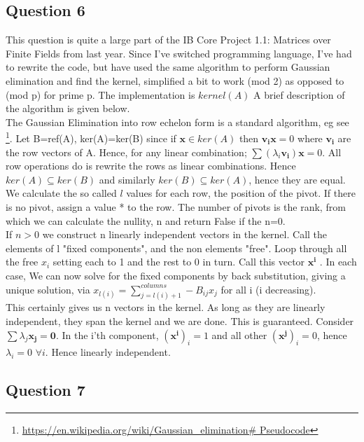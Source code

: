 \documentclass[10pt,a4paper]{report}
\begin{document}
\subsection*{Question 6}

This question is quite a large part of the IB Core Project 1.1: Matrices over Finite Fields from last year. Since I've switched programming language, I've had to rewrite the code, but have used the same algorithm to perform Gaussian elimination and find the kernel, simplified a bit to work (mod 2) as opposed to (mod p) for prime p. The implementation is $kernel(A)$ A brief description of the algorithm is given below.\\

The Gaussian Elimination into row echelon form is a standard algorithm, eg see \footnote{\url{https://en.wikipedia.org/wiki/Gaussian_elimination\# Pseudocode}}. Let B=ref(A), ker(A)=ker(B) since if $\bm{x} \in ker(A)$ then $\bm{v_i}\bm{x}=0$ where $\bm{v_i}$ are the row vectors of A. Hence, for any linear combination; $\sum( \lambda_i \bm{v_i})\bm{x}=0$. All row operations do is rewrite the rows as linear combinations. Hence $ker(A)\subseteq ker(B)$ and similarly $ker(B)\subseteq ker(A)$, hence they are equal.\\

We calculate the so called $l$ values for each row, the position of the pivot. If there is no pivot, assign a value * to the row. The number of pivots is the rank, from which we can calculate the nullity, n and return False if the n=0. \\

If $n>0$ we construct n linearly independent vectors in the kernel. Call the elements of l "fixed components", and the non elements "free". Loop through all the free $x_i$ setting each to 1 and the rest to 0 in turn. Call this vector $\bm{x^i}$ . In each case, We can now solve for the fixed components by back substitution, giving a unique solution, via $x_{l(i)}=\sum_{j=l(i)+1}^{columns} -B_{ij}x_j$ for all i (i decreasing). \\

This certainly gives us n vectors in the kernel. As long as they are linearly independent, they span the kernel and we are done. This is guaranteed. Consider
$\sum\lambda_j \bm{x_j} =\bm{0}$. In the i'th component, $(\bm{x^i})_i=1$ and all other $(\bm{x^j})_i=0$, hence $\lambda_i=0$ $\forall i$. Hence linearly independent.\\

\subsection*{Question 7}
\end{document}
